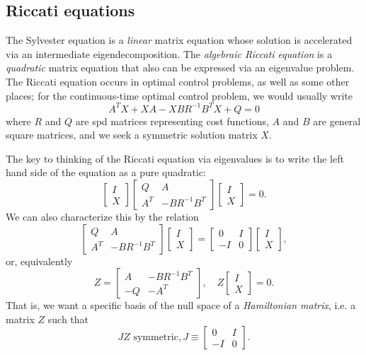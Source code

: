 \subsection{Riccati equations}

The Sylvester equation is a {\em linear} matrix equation whose solution
is accelerated via an intermediate eigendecomposition.  The
{\em algebraic Riccati equation} is a {\em quadratic} matrix equation
that also can be expressed via an eigenvalue problem.  The Riccati
equation occurs in optimal control problems, as well as some other places;
for the continuous-time optimal control problem, we would usually write
\[
  A^T X + XA - XBR^{-1} B^T X + Q = 0
\]
where $R$ and $Q$ are spd matrices representing cost functions,
$A$ and $B$ are general square matrices, and we seek a symmetric solution
matrix $X$.

The key to thinking of the Riccati equation via eigenvalues is to write
the left hand side of the equation as a pure quadratic:
\[
  \begin{bmatrix} I \\ X \end{bmatrix}
  \begin{bmatrix} Q & A \\ A^T & -BR^{-1}B^T \end{bmatrix}
  \begin{bmatrix} I \\ X \end{bmatrix} = 0.
\]
We can also characterize this by the relation
\[
  \begin{bmatrix} Q & A \\ A^T & -BR^{-1} B^T \end{bmatrix}
  \begin{bmatrix} I \\ X \end{bmatrix} =
  \begin{bmatrix} 0 & I \\ -I & 0 \end{bmatrix}
  \begin{bmatrix} I \\ X \end{bmatrix},
\]
or, equivalently
\[
  Z = \begin{bmatrix}
    A & -BR^{-1} B^T \\
    -Q & -A^T
  \end{bmatrix}, \quad Z 
  \begin{bmatrix} I \\ X \end{bmatrix} = 0.
\]
That is, we want a specific basis of the null space of
a {\em Hamiltonian matrix}, i.e. a matrix $Z$ such that
\[
  JZ \mbox{ symmetric}, J \equiv \begin{bmatrix} 0 & I \\ -I & 0 \end{bmatrix}.
\]

